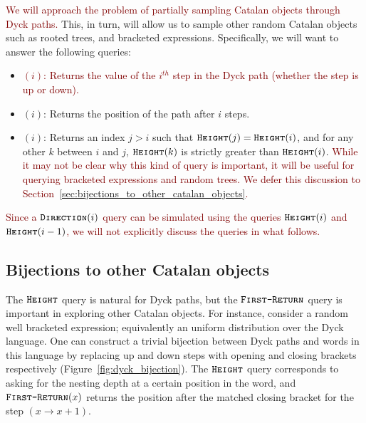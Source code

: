 \textcolor{Maroon}{We will approach the problem of partially sampling Catalan objects through Dyck paths.}
This, in turn, will allow us to sample other random Catalan objects such as rooted trees, and bracketed expressions.
Specifically, we will want to answer the following queries:
\begin{itemize}
    \item \textcolor{Maroon}{$(i)$: Returns the value of the $i^{th}$ step in the Dyck path (whether the step is up or down).}
    \item {}$(i)$: Returns the position of the path after $i$ steps.
    \item {}$(i)$: Returns an index $j>i$ such that $\texttt{\textsc{Height}}(j)=\texttt{\textsc{Height}}(i)$, and for any other $k$ between $i$ and $j$,
    $\texttt{\textsc{Height}}(k)$ is strictly greater than $\texttt{\textsc{Height}}(i)$.
    \textcolor{Maroon}{
    While it may not be clear why this kind of query is important, it will be useful for querying bracketed expressions and random trees.
    We defer this discussion to Section~\ref{sec:bijections_to_other_catalan_objects}.}
\end{itemize}
\textcolor{Maroon}{Since a $\texttt{\textsc{Direction}}(i)$ query can be simulated using the queries $\texttt{\textsc{Height}}(i)$ and $\texttt{\textsc{Height}}(i-1)$,
we will not explicitly discuss the  queries in what follows.}



\subsection{Bijections to other Catalan objects}%
The $\texttt{\textsc{Height}}$ query is natural for Dyck paths, but the $\texttt{\textsc{First-Return}}$ query is important in exploring other Catalan objects.
For instance, consider a random well bracketed expression; equivalently an uniform distribution over the Dyck language.
One can construct a trivial bijection between Dyck paths and words in this language
by replacing up and down steps with opening and closing brackets respectively (Figure~\ref{fig:dyck_bijection}).
The $\texttt{\textsc{Height}}$ query corresponds to asking for the nesting depth at a certain position in the word,
and $\texttt{\textsc{First-Return}}(x)$ returns the position after the matched closing bracket for the step $(x\rightarrow x+1)$.

